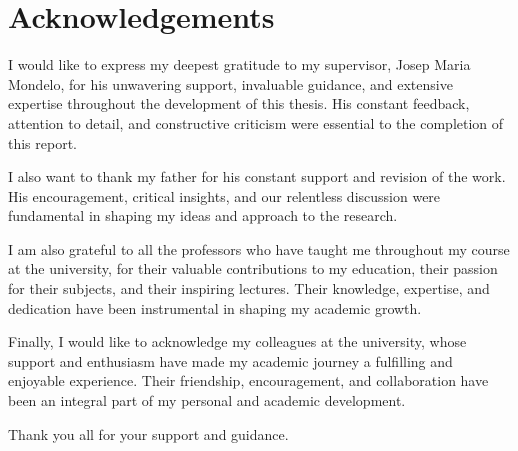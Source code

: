 \documentclass[../main.tex]{subfiles}
\begin{document}
\section*{Acknowledgements}
I would like to express my deepest gratitude to my supervisor, Josep Maria Mondelo, for his unwavering support, invaluable guidance, and extensive expertise throughout the development of this thesis. His constant feedback, attention to detail, and constructive criticism were essential to the completion of this report.

I also want to thank my father for his constant support and revision of the work. His encouragement, critical insights, and our relentless discussion were fundamental in shaping my ideas and approach to the research.

I am also grateful to all the professors who have taught me throughout my course at the university, for their valuable contributions to my education, their passion for their subjects, and their inspiring lectures. Their knowledge, expertise, and dedication have been instrumental in shaping my academic growth.

Finally, I would like to acknowledge my colleagues at the university, whose support and enthusiasm have made my academic journey a fulfilling and enjoyable experience. Their friendship, encouragement, and collaboration have been an integral part of my personal and academic development.

Thank you all for your support and guidance.
\end{document}
